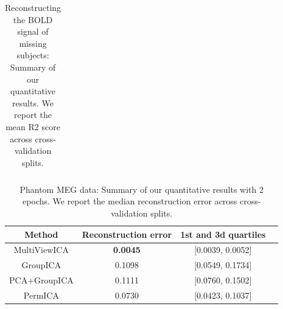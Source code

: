 \begin{table}
\begin{tabular}{|c|c | c | c|}
         
    \end{tabular}
    \caption{Reconstructing the BOLD signal of missing subjects: Summary of our quantitative results. We report the mean R2 score across cross-validation splits.}
    \label{tab:recon}
\end{table}

\begin{table}
    \centering
    \begin{tabular}{|c|c|c|c}
    \hline
         \textbf{Method} & \textbf{Reconstruction error} & \textbf{1st and 3d quartiles} 
         \\
         \hline
         MultiViewICA & \textbf{0.0045} & [0.0039, 0.0052] \\ 
GroupICA & 0.1098 & [0.0549, 0.1734] \\ 
PCA+GroupICA & 0.1111 & [0.0760, 0.1502] \\ 
PermICA & 0.0730 & [0.0423, 0.1037] \\ 
\hline
    \end{tabular}
    \caption{Phantom MEG data: Summary of our quantitative results with 2 epochs. We report the median reconstruction error across cross-validation splits.}
    \label{tab:meg}
\end{table}

